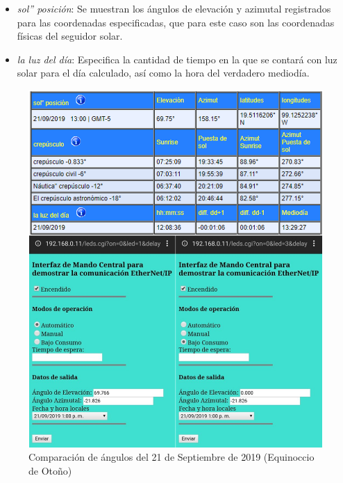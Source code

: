 \begin{itemize}
    \item \textit{sol'' posición}: Se muestran los ángulos de elevación y azimutal registrados para las coordenadas especificadas, que para este caso son las coordenadas físicas del seguidor solar.
    \item \textit{la luz del día}: Especifica la cantidad de tiempo en la que se contará con luz solar para el día calculado, así como la hora del verdadero mediodía.
\end{itemize}

\begin{figure}[H]
	\centering
	\includegraphics[width=\columnwidth]{imagenes/VAL_O}
	\caption{Comparación de ángulos del 21 de Septiembre de 2019 (Equinoccio de Otoño)}
	\label{fig:VAL_O}
\end{figure}

